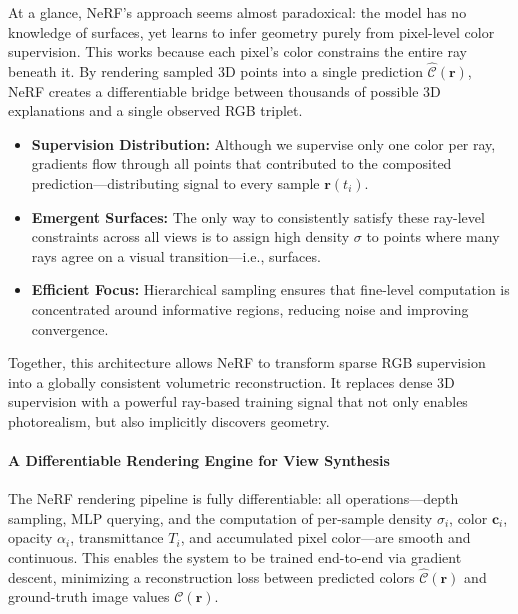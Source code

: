 At a glance, NeRF’s approach seems almost paradoxical: the model has no knowledge of surfaces, yet learns to infer geometry purely from pixel-level color supervision. This works because each pixel’s color constrains the entire ray beneath it. By rendering sampled 3D points into a single prediction \( \hat{\mathcal{C}}(\mathbf{r}) \), NeRF creates a differentiable bridge between thousands of possible 3D explanations and a single observed RGB triplet.

\begin{itemize}
    \item \textbf{Supervision Distribution:} Although we supervise only one color per ray, gradients flow through all points that contributed to the composited prediction—distributing signal to every sample \( \mathbf{r}(t_i) \).
    
    \item \textbf{Emergent Surfaces:} The only way to consistently satisfy these ray-level constraints across all views is to assign high density \( \sigma \) to points where many rays agree on a visual transition—i.e., surfaces.
    
    \item \textbf{Efficient Focus:} Hierarchical sampling ensures that fine-level computation is concentrated around informative regions, reducing noise and improving convergence.
\end{itemize}

\noindent
Together, this architecture allows NeRF to transform sparse RGB supervision into a globally consistent volumetric reconstruction. It replaces dense 3D supervision with a powerful ray-based training signal that not only enables photorealism, but also implicitly discovers geometry.

\paragraph{A Differentiable Rendering Engine for View Synthesis}
The NeRF rendering pipeline is fully differentiable: all operations—depth sampling, MLP querying, and the computation of per-sample density \( \sigma_i \), color \( \mathbf{c}_i \), opacity \( \alpha_i \), transmittance \( T_i \), and accumulated pixel color—are smooth and continuous. This enables the system to be trained end-to-end via gradient descent, minimizing a reconstruction loss between predicted colors \( \hat{\mathcal{C}}(\mathbf{r}) \) and ground-truth image values \( \mathcal{C}(\mathbf{r}) \).

